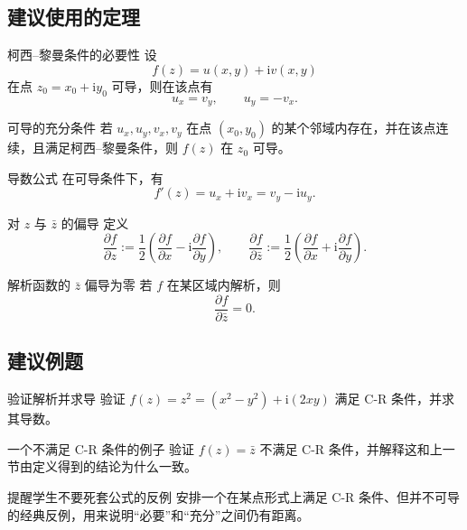 \subsection*{建议使用的定理}
\begin{dingli}{柯西--黎曼条件的必要性}{}
设
\[
    f(z)=u(x,y)+\mathrm{i}v(x,y)
\]
在点 $z_0=x_0+\mathrm{i}y_0$ 可导，则在该点有
\[
    u_x=v_y,\qquad u_y=-v_x.
\]
\end{dingli}

\begin{dingli}{可导的充分条件}{}
若 $u_x,u_y,v_x,v_y$ 在点 $(x_0,y_0)$ 的某个邻域内存在，并在该点连续，且满足柯西--黎曼条件，则 $f(z)$ 在 $z_0$ 可导。
\end{dingli}

\begin{dingli}{导数公式}{}
在可导条件下，有
\[
    f'(z)=u_x+\mathrm{i}v_x=v_y-\mathrm{i}u_y.
\]
\end{dingli}

\begin{dingliyi}{对 $z$ 与 $\bar z$ 的偏导}{}
定义
\[
    \frac{\partial f}{\partial z}
    :=\frac12\left(\frac{\partial f}{\partial x}
    -\mathrm{i}\frac{\partial f}{\partial y}\right),\qquad
    \frac{\partial f}{\partial \bar z}
    :=\frac12\left(\frac{\partial f}{\partial x}
    +\mathrm{i}\frac{\partial f}{\partial y}\right).
\]
\end{dingliyi}

\begin{dingli}{解析函数的 $\bar z$ 偏导为零}{}
若 $f$ 在某区域内解析，则
\[
    \frac{\partial f}{\partial \bar z}=0.
\]
\end{dingli}

\subsection*{建议例题}
\begin{lizi}{验证解析并求导}{}
验证 $f(z)=z^2=(x^2-y^2)+\mathrm{i}(2xy)$ 满足 C-R 条件，并求其导数。
\end{lizi}

\begin{lizi}{一个不满足 C-R 条件的例子}{}
验证 $f(z)=\bar z$ 不满足 C-R 条件，并解释这和上一节由定义得到的结论为什么一致。
\end{lizi}

\begin{lizi}{提醒学生不要死套公式的反例}{}
安排一个在某点形式上满足 C-R 条件、但并不可导的经典反例，用来说明``必要''和``充分''之间仍有距离。
\end{lizi}

